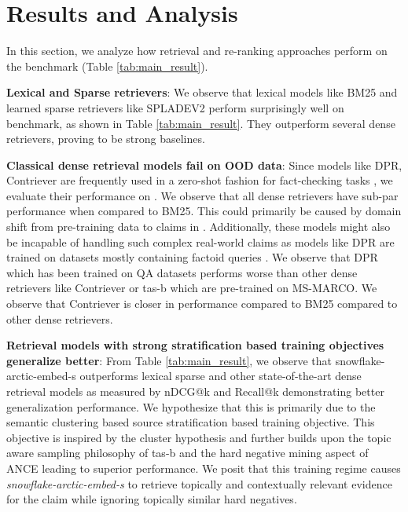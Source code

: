 
\section{Results and  Analysis}
In this section, we analyze how retrieval and re-ranking approaches perform on the \name{} benchmark (Table \ref{tab:main_result}). 

\textbf{Lexical and Sparse retrievers}: We observe that lexical models like BM25 and learned sparse retrievers like SPLADEV2 perform surprisingly well on \name{} benchmark, as shown in Table \ref{tab:main_result}. They outperform several dense retrievers, proving to be strong baselines.

\textbf{Classical dense retrieval models fail on OOD data}: Since models like DPR, Contriever are frequently used in a zero-shot fashion for fact-checking tasks \cite{gupta-etal-2022-dialfact,sriram-etal-2024-contrastive}, we evaluate their performance on \name{}. We observe that all dense retrievers have sub-par performance when compared to BM25. This could primarily be caused by domain shift from pre-training data to claims in \name{}. Additionally, these models might also be incapable of handling such complex real-world claims as models like DPR are trained on datasets mostly containing factoid queries \cite{sriram-etal-2024-contrastive}.  We observe that DPR which has been trained on QA datasets performs worse than other dense retrievers like Contriever or tas-b which are pre-trained on MS-MARCO. We observe that Contriever is closer in performance compared to BM25 compared to other dense retrievers.


\textbf{Retrieval models with strong stratification based training objectives generalize better}:
From Table \ref{tab:main_result}, we observe that snowflake-arctic-embed-s outperforms lexical sparse and other state-of-the-art dense retrieval models  as measured by nDCG@k and Recall@k demonstrating better generalization performance. We hypothesize that this is primarily due to the semantic clustering based source stratification \cite{merrick2024embeddingclusteringdataimprove} based training objective. This objective is inspired by the cluster hypothesis \cite{clustering_hypothesis} and further builds upon the topic aware sampling philosophy of tas-b \cite{tas-b} and the hard negative mining aspect of ANCE \cite{ance} leading to superior performance. We posit that this training regime causes \textit{snowflake-arctic-embed-s} to retrieve topically and contextually relevant evidence for the claim while ignoring topically similar hard negatives. 


